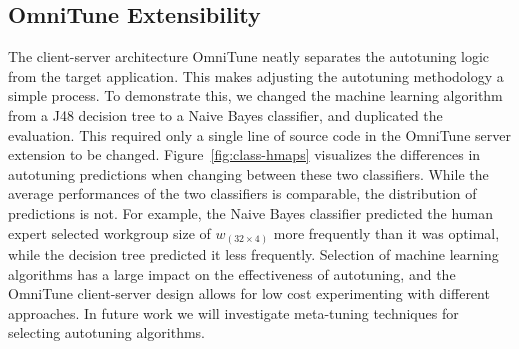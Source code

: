 \documentclass[nonatbib,preprint,nocopyrightspace,9pt]{sigplanconf}
\begin{document}
\subsection{OmniTune Extensibility}

The client-server architecture OmniTune neatly separates the autotuning logic
from the target application. This makes adjusting the autotuning methodology a
simple process. To demonstrate this, we changed the machine learning algorithm
from a J48 decision tree to a Naive Bayes classifier, and duplicated the
evaluation. This required only a single line of source code in the OmniTune
server extension to be changed. Figure~\ref{fig:class-hmaps} visualizes the
differences in autotuning predictions when changing between these two
classifiers. While the average performances of the two classifiers is
comparable, the distribution of predictions is not. For example, the Naive Bayes
classifier predicted the human expert selected workgroup size of $w_{(32 \times
4)}$ more frequently than it was optimal, while the decision tree predicted it
less frequently. Selection of machine learning algorithms has a large impact on
the effectiveness of autotuning, and the OmniTune client-server design allows
for low cost experimenting with different approaches. In future work we will
investigate meta-tuning techniques for selecting autotuning algorithms.
\end{document}
